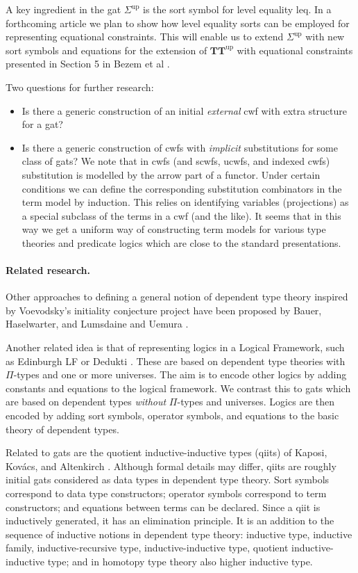 \documentclass[11pt,a4paper]{article}
\theoremstyle{plain}
\theoremstyle{definition}
\def\leq{\mathrm{leq}}
\def\Sigmaint{{\Sigma^\mathrm{up}}}
\def\TTint{{\mathbf{TT}^\mathrm{up}}}
\begin{document}
A key ingredient in the gat $\Sigmaint$ is the sort symbol for level equality $\leq$. In a forthcoming article we plan to show how level equality sorts can be employed for representing equational constraints. This will enable us to extend $\Sigmaint$ with new sort symbols and equations for the extension of $\TTint$ with equational constraints presented in Section 5 in Bezem et al \cite{BezemCDE22}.

Two questions for further research:
\begin{itemize}
\item Is there a generic construction of an initial {\em external} cwf with extra structure for a gat?
\item Is there a generic construction of cwfs with {\em implicit} substitutions for some class of gats?
 We note that in cwfs (and scwfs, ucwfs, and indexed cwfs) substitution is modelled by the arrow part of a functor. Under certain conditions we can define the corresponding substitution combinators in the term model by induction. This relies on identifying variables (projections) as a special subclass of the terms in a cwf (and the like). It seems that in this way we get a uniform way of constructing term models for various type theories and predicate logics which are close to the standard presentations.
 \end{itemize}

\paragraph{Related research.}
Other approaches to defining a general notion of dependent type theory inspired by Voevodsky's initiality conjecture project have been proposed by Bauer, Haselwarter, and Lumsdaine \cite{BauerHL20} and Uemura \cite{Uemura23}.

Another related idea is that of representing logics in a {Logical Framework}, such as Edinburgh LF \cite{harper-honsell-plotkin} or Dedukti \cite{dowek-dedukti}. These are based on dependent type theories with $\Pi$-types and one or more universes. The aim is to encode other logics by adding constants and equations to the logical framework. We contrast this to gats which are based on dependent types {\em without} $\Pi$-types and universes. Logics are then encoded by adding sort symbols, operator symbols, and equations to the basic theory of dependent types.

Related to gats are the quotient inductive-inductive types (qiits) of Kaposi, Kov{\'{a}}cs, and Altenkirch
\cite{kaposi:qiits,kovacs:phd}. Although formal details may differ, qiits are roughly initial gats considered as data types in dependent type theory. Sort symbols correspond to data type constructors; operator symbols correspond to term constructors; and equations between terms can be declared. Since a qiit is inductively generated, it has an elimination principle. It is an addition to the sequence of inductive notions in dependent type theory: inductive type, inductive family, inductive-recursive type, inductive-inductive type, quotient inductive-inductive type; and in homotopy type theory also higher inductive type.
\end{document}

